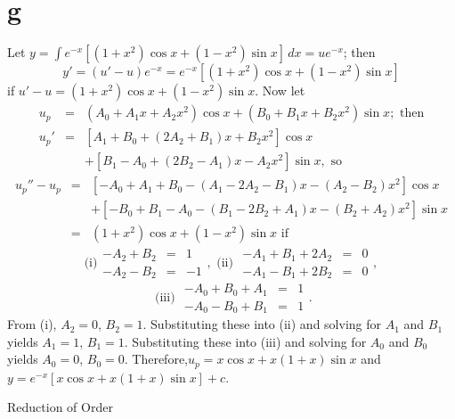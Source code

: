 \documentclass[dvips]{book}
\numberwithin{example}{section}
\numberwithin{equation}{section}
\numberwithin{theorem}{section}
\numberwithin{table}{section}
\numberwithin{figure}{section}
\begin{document}
\part{g} Let $y=\int e^{-x}\left[(1+x^2)\cos x+(1-x^2)\sin
x\right]\,dx =ue^{-x}$; then $$
y'=(u'-u)e^{-x}=e^{-x}\left[(1+x^2)\cos x+(1-x^2)\sin x\right] $$ if
$u'-u=(1+x^2)\cos x+(1-x^2)\sin x$. Now let \begin{eqnarray*}
u_p&=&(A_0+A_1x+A_2x^2)\cos x +(B_0+B_1x+B_2x^2)\sin x;\mbox{ then}\\
u_p'&=&\left[A_1+B_0+(2A_2+B_1)x+B_2x^2\right]\cos x\\ &&
+\left[B_1-A_0+(2B_2-A_1)x-A_2x^2\right]\sin x, \mbox{ so}
\end{eqnarray*} \begin{eqnarray*}
u_p''-u_p&=&\left[-A_0+A_1+B_0-(A_1-2A_2-B_1)x-(A_2-B_2)x^2\right]\cos
x\\ && +\left[-B_0+B_1-A_0-(B_1-2B_2+A_1)x-(B_2+A_2)x^2\right]\sin x\\
&=& (1+x^2)\cos x+(1-x^2)\sin x \mbox{ if} \end{eqnarray*} $$
\mbox{(i)} \begin{array}{rcr} -A_2+B_2&=&1\\ -A_2-B_2&=&-1
\end{array}, \mbox{ (ii) } \begin{array}{rcr} -A_1+B_1+2A_2&=&0\\
-A_1-B_1+2B_2&=&0\end{array}, $$ $$ \mbox{ (iii) } \begin{array}{rcl}
-A_0+B_0+A_1&=&1\\ -A_0-B_0+B_1&=&1 \end{array}. $$ From (i), $A_2=0$,
$B_2=1$. Substituting these into (ii) and solving for $A_1$ and $B_1$
yields $A_1=1$, $B_1=1$. Substituting these into (iii) and solving for
$A_0$ and $B_0$ yields $A_0=0$, $B_0=0$. Therefore,$u_p=x\cos
x+x(1+x)\sin x$ and $y=e^{-x}\left[x\cos x+x(1+x)\sin x\right]+c$.




{Reduction of Order}
\renewcommand{\thissection}{}
\thissection


\vspace*{-5pt}

\end{document}
